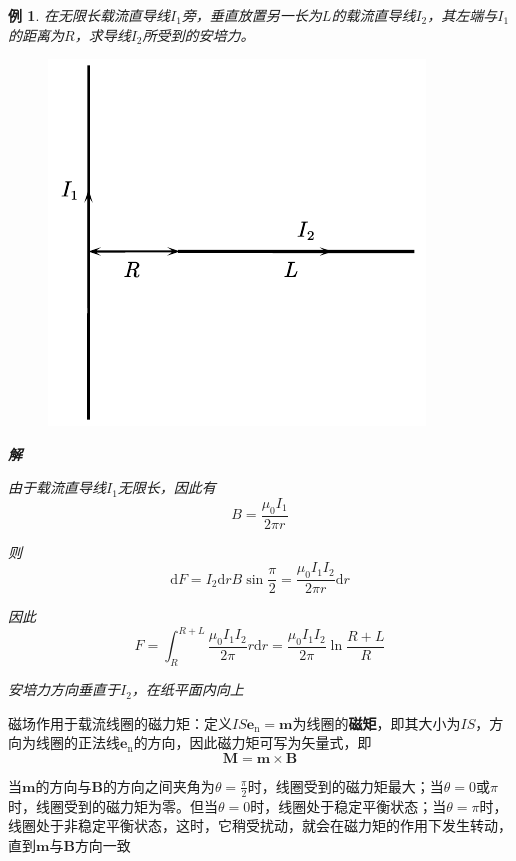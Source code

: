 \documentclass[12pt, a4paper, twoside]{ctexbook}
\newtheorem{example}[theorem]{例}
\begin{document}
\begin{example}
    在无限长载流直导线$I_1$旁，垂直放置另一长为$L$的载流直导线$I_2$，其左端与$I_1$的距离为$R$，求导线$I_2$所受到的安培力。
    \begin{figure}[H]
        \centerline{\includegraphics[scale=0.90]{CH10EX07.pdf}}
    \end{figure}
    
    \noindent\textbf{解}
    
    由于载流直导线$I_1$无限长，因此有
    $$
    B=\frac{\mu_0I_1}{2\pi r}
    $$

    则
    $$
    \mathrm{d}F=I_2\mathrm{d}rB\sin\frac{\pi}{2}=\frac{\mu_0I_1I_2}{2\pi r}\mathrm{d}r
    $$

    因此
    $$
    F=\int_{R}^{R+L}\frac{\mu_0I_1I_2}{2\pi}r\mathrm{d}r=\frac{\mu_0I_1I_2}{2\pi}\ln\frac{R+L}{R}
    $$
    
    安培力方向垂直于$I_2$，在纸平面内向上
\end{example}

{\sonti 磁场作用于载流线圈的磁力矩}：定义$IS\boldsymbol{e}_\mathrm{n}=\boldsymbol{m}$为线圈的\textbf{磁矩}，即其大小为$IS$，方向为线圈的正法线$\boldsymbol{e}_\mathrm{n}$的方向，因此磁力矩可写为矢量式，即
$$
\boldsymbol{M}=\boldsymbol{m}\times\boldsymbol{B}
$$

当$\boldsymbol{m}$的方向与$\boldsymbol{B}$的方向之间夹角为$\theta=\frac{\pi}{2}$时，线圈受到的磁力矩最大；当$\theta=0$或$\pi$时，线圈受到的磁力矩为零。但当$\theta=0$时，线圈处于稳定平衡状态；当$\theta=\pi$时，线圈处于非稳定平衡状态，这时，它稍受扰动，就会在磁力矩的作用下发生转动，直到$\boldsymbol{m}$与$\boldsymbol{B}$方向一致
\end{document}
